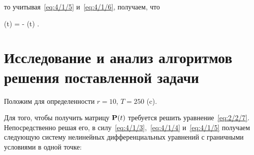 то учитывая~\ref{eq:4/1/5} и~\ref{eq:4/1/6}, получаем, что

	\optU(t) = -  (t) \mbox{.}
\eeq




\section{Исследование и анализ алгоритмов решения поставленной задачи}



Положим для определенности $r = 10$, $T = 250$ (c).

Для того, чтобы получить матрицу $\mathbf{P}(t)$ требуется решить уравнение~\vref{eq:2/2/7}. Непосредственно решая его, в силу~\ref{eq:4/1/3},~\ref{eq:4/1/4} и~\ref{eq:4/1/5} получаем следующую систему нелинейных дифференциальных уравнений с граничными условиями в одной точке:

\eeq

